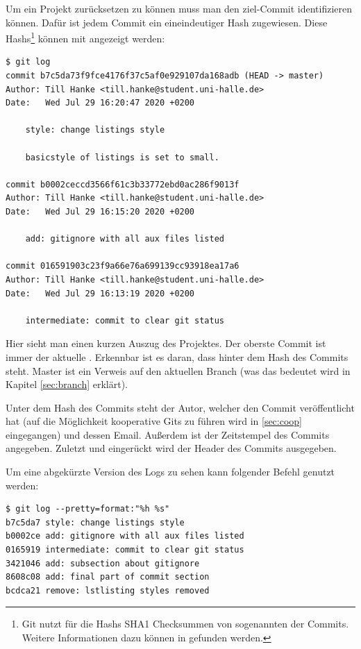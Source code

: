 Um ein Projekt zurücksetzen zu können muss man den ziel-Commit identifizieren können. Dafür ist jedem Commit ein eineindeutiger Hash zugewiesen. Diese Hashs\footnote{Git nutzt für die Hashs SHA1 Checksummen von sogenannten  der Commits. Weitere Informationen dazu können in \cite{ProGit} gefunden werden.} können mit  angezeigt werden:
\begin{lstlisting}
$ git log
commit b7c5da73f9fce4176f37c5af0e929107da168adb (HEAD -> master)
Author: Till Hanke <till.hanke@student.uni-halle.de>
Date:   Wed Jul 29 16:20:47 2020 +0200

    style: change listings style
    
    basicstyle of listings is set to small.

commit b0002ceccd3566f61c3b33772ebd0ac286f9013f
Author: Till Hanke <till.hanke@student.uni-halle.de>
Date:   Wed Jul 29 16:15:20 2020 +0200

    add: gitignore with all aux files listed

commit 016591903c23f9a66e76a699139cc93918ea17a6
Author: Till Hanke <till.hanke@student.uni-halle.de>
Date:   Wed Jul 29 16:13:19 2020 +0200

    intermediate: commit to clear git status
\end{lstlisting}
Hier sieht man einen kurzen Auszug des Projektes. Der oberste Commit ist immer der aktuelle . Erkennbar ist es daran, dass hinter dem Hash des Commits  steht. Master ist ein Verweis auf den aktuellen Branch (was das bedeutet wird in Kapitel \ref{sec:branch} erklärt).

Unter dem Hash des Commits steht der Autor, welcher den Commit veröffentlicht hat (auf die Möglichkeit kooperative Gits zu führen wird in \ref{sec:coop} eingegangen) und dessen Email.
Außerdem ist der Zeitstempel des Commits angegeben. Zuletzt und eingerückt wird der Header des Commits ausgegeben.

Um eine abgekürzte Version des Logs zu sehen kann folgender Befehl genutzt werden:
\begin{lstlisting}
$ git log --pretty=format:"%h %s" 
b7c5da7 style: change listings style
b0002ce add: gitignore with all aux files listed
0165919 intermediate: commit to clear git status
3421046 add: subsection about gitignore
8608c08 add: final part of commit section
bcdca21 remove: lstlisting styles removed
\end{lstlisting}

